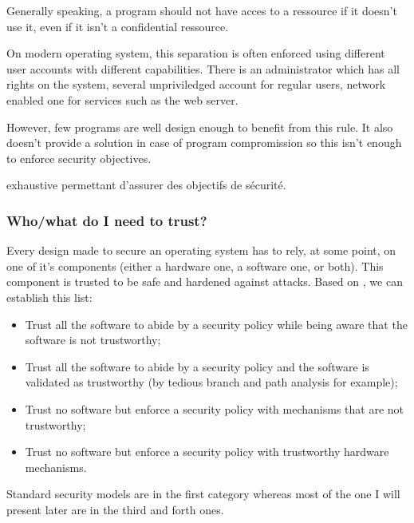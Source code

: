 \documentclass[pdftex,a4paper,titlepage,11pt]{article}
\begin{document}
\bigskip

Generally speaking, a program should not have acces to a ressource if it doesn't
use it, even if it isn't a confidential ressource.

\bigskip

On modern operating system, this separation is often enforced using different
user accounts with different capabilities. There is an administrator which has
all rights on the system, several unpriviledged account for regular users,
network enabled one for services such as the web server.

\bigskip

However, few programs are well design enough to benefit from this rule. It also
doesn't provide a solution in case of program compromission so this isn't enough
to enforce security objectives.

exhaustive permettant d'assurer des objectifs de sécurité.

\subsubsection{Who/what do I need to trust?}

Every design made to secure an operating system has to rely, at some point, on
one of it's components (either a hardware one, a software one, or both). This
component is trusted to be safe and hardened against attacks. Based on
\cite{WCS}, we can establish this list:

\begin{itemize}
	\item Trust all the software to abide by a security policy while being aware
that the software is not trustworthy;

	\item Trust all the software to abide by a security policy and the software
is validated as trustworthy (by tedious branch and path analysis for example);

	\item Trust no software but enforce a security policy with mechanisms that
are not trustworthy;

	\item Trust no software but enforce a security policy with trustworthy
hardware mechanisms.
\end{itemize}

\smallskip

Standard security models are in the first category whereas most of the one I
will present later are in the third and forth ones.
\end{document}
